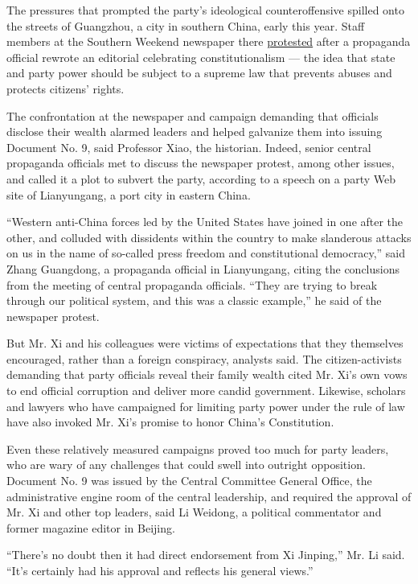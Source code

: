 The pressures that prompted the party's ideological counteroffensive
spilled onto the streets of Guangzhou, a city in southern China, early
this year. Staff members at the Southern Weekend newspaper there
\href{http://www.nytimes3xbfgragh.onion/2013/01/07/world/asia/chinese-newspaper-challenges-the-censors.html}{protested}
after a propaganda official rewrote an editorial celebrating
constitutionalism --- the idea that state and party power should be
subject to a supreme law that prevents abuses and protects citizens'
rights.

The confrontation at the newspaper and campaign demanding that officials
disclose their wealth alarmed leaders and helped galvanize them into
issuing Document No. 9, said Professor Xiao, the historian. Indeed,
senior central propaganda officials met to discuss the newspaper
protest, among other issues, and called it a plot to subvert the party,
according to a speech on a party Web site of Lianyungang, a port city in
eastern China.

``Western anti-China forces led by the United States have joined in one
after the other, and colluded with dissidents within the country to make
slanderous attacks on us in the name of so-called press freedom and
constitutional democracy,'' said Zhang Guangdong, a propaganda official
in Lianyungang, citing the conclusions from the meeting of central
propaganda officials. ``They are trying to break through our political
system, and this was a classic example,'' he said of the newspaper
protest.

But Mr. Xi and his colleagues were victims of expectations that they
themselves encouraged, rather than a foreign conspiracy, analysts said.
The citizen-activists demanding that party officials reveal their family
wealth cited Mr. Xi's own vows to end official corruption and deliver
more candid government. Likewise, scholars and lawyers who have
campaigned for limiting party power under the rule of law have also
invoked Mr. Xi's promise to honor China's Constitution.

Even these relatively measured campaigns proved too much for party
leaders, who are wary of any challenges that could swell into outright
opposition. Document No. 9 was issued by the Central Committee General
Office, the administrative engine room of the central leadership, and
required the approval of Mr. Xi and other top leaders, said Li Weidong,
a political commentator and former magazine editor in Beijing.

``There's no doubt then it had direct endorsement from Xi Jinping,'' Mr.
Li said. ``It's certainly had his approval and reflects his general
views.''

